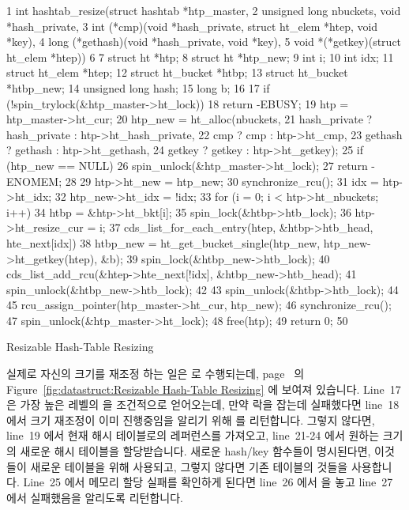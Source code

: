 \begin{listing*}[tb]
{ \scriptsize
\begin{verbbox}
 1 int hashtab_resize(struct hashtab *htp_master,
 2                    unsigned long nbuckets, void *hash_private,
 3                    int (*cmp)(void *hash_private, struct ht_elem *htep, void *key),
 4                    long (*gethash)(void *hash_private, void *key),
 5                    void *(*getkey)(struct ht_elem *htep))
 6 {
 7   struct ht *htp;
 8   struct ht *htp_new;
 9   int i;
10   int idx;
11   struct ht_elem *htep;
12   struct ht_bucket *htbp;
13   struct ht_bucket *htbp_new;
14   unsigned long hash;
15   long b;
16 
17   if (!spin_trylock(&htp_master->ht_lock))
18     return -EBUSY;
19   htp = htp_master->ht_cur;
20   htp_new = ht_alloc(nbuckets,
21                      hash_private ? hash_private : htp->ht_hash_private,
22                      cmp ? cmp : htp->ht_cmp,
23                      gethash ? gethash : htp->ht_gethash,
24                      getkey ? getkey : htp->ht_getkey);
25   if (htp_new == NULL) {
26     spin_unlock(&htp_master->ht_lock);
27     return -ENOMEM;
28   }
29   htp->ht_new = htp_new;
30   synchronize_rcu();
31   idx = htp->ht_idx;
32   htp_new->ht_idx = !idx;
33   for (i = 0; i < htp->ht_nbuckets; i++) {
34     htbp = &htp->ht_bkt[i];
35     spin_lock(&htbp->htb_lock);
36     htp->ht_resize_cur = i;
37     cds_list_for_each_entry(htep, &htbp->htb_head, hte_next[idx]) {
38       htbp_new = ht_get_bucket_single(htp_new, htp_new->ht_getkey(htep), &b);
39       spin_lock(&htbp_new->htb_lock);
40       cds_list_add_rcu(&htep->hte_next[!idx], &htbp_new->htb_head);
41       spin_unlock(&htbp_new->htb_lock);
42     }
43     spin_unlock(&htbp->htb_lock);
44   }
45   rcu_assign_pointer(htp_master->ht_cur, htp_new);
46   synchronize_rcu();
47   spin_unlock(&htp_master->ht_lock);
48   free(htp);
49   return 0;
50 }
\end{verbbox}
}
\centering
\theverbbox
\caption{Resizable Hash-Table Resizing}
\label{lst:datastruct:Resizable Hash-Table Resizing}
\end{listing*}

실제로 자신의 크기를 재조정 하는 일은  로 수행되는데,
page~\pageref{fig:datastruct:Resizable Hash-Table Resizing} 의
Figure~\ref{fig:datastruct:Resizable Hash-Table Resizing} 에 보여져 있습니다.
Line~17 은 가장 높은 레벨의  을 조건적으로 얻어오는데, 만약 락을
잡는데 실패했다면 line~18 에서 크기 재조정이 이미 진행중임을 알리기 위해
 를 리턴합니다.
그렇지 않다면, line~19 에서 현재 해시 테이블로의 레퍼런스를 가져오고,
line~21-24 에서 원하는 크기의 새로운 해시 테이블을 할당받습니다.
새로운 hash/key 함수들이 명시된다면, 이것들이 새로운 테이블을 위해 사용되고,
그렇지 않다면 기존 테이블의 것들을 사용합니다.
Line~25 에서 메모리 할당 실패를 확인하게 된다면 line~26 에서  을
놓고 line~27 에서 실패했음을 알리도록 리턴합니다.
\iffalse

